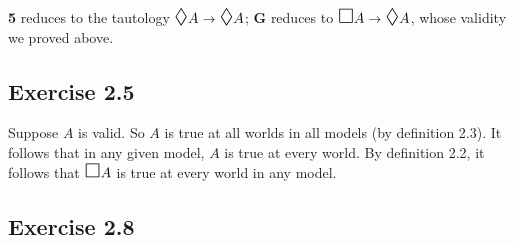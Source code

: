 \documentclass{scrartcl}
\let\oldbox\Box
\renewcommand\Box{\scaleobj{1.2}{\oldbox}}
\let\olddiamond\Diamond
\renewcommand\Diamond{\scaleobj{1.2}{\olddiamond}}
\let\oldto\to
\renewcommand\to{\scaleobj{0.95}{\,\oldto\,}}
\begin{document}
  \textbf{5} reduces to the tautology $\Diamond A \to \Diamond A$; \textbf{G}
  reduces to $\Box A \to \Diamond A$, whose validity we proved above.

\subsection*{Exercise 2.5}

  Suppose $A$ is valid. So $A$ is true at all worlds in all models (by
  definition 2.3). It follows that in any given model, $A$ is true
  at every world. By definition 2.2, it follows that
  $\Box A$ is true at every world in any model.

\subsection*{Exercise 2.8}
\end{document}
